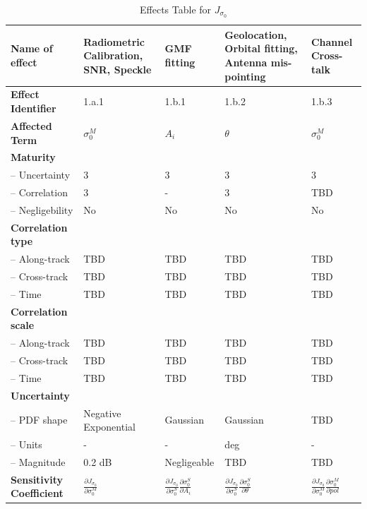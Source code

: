 \begin{table}[h]
	\centering
	\scriptsize %
	\setlength{\tabcolsep}{2pt} %
	\caption{Effects Table for $J_{\sigma_{0}}$}
	
	\begin{tabularx}{\textwidth}{l | X | X | X | X}
		\toprule
		\textbf{Name of effect} & Radiometric Calibration, SNR, Speckle & GMF fitting & Geolocation, Orbital fitting, Antenna mis-pointing & Channel Cross-talk \\
		\midrule
		\textbf{Effect Identifier} & 1.a.1 & 1.b.1 & 1.b.2 & 1.b.3 \\
		\midrule
		\textbf{Affected Term} & $\sigma_{0}^{M}$ & $A_{i}$ & $\theta$ & $\sigma_{0}^{M}$ \\
		\midrule
		\textbf{Maturity} &  &  & & \\
		\quad -- Uncertainty & 3 & 3 & 3 & 3 \\
		\quad -- Correlation & 3 & - & 3 & TBD \\
		\quad -- Negligebility & No & No & No & No \\
		\midrule
		\textbf{Correlation type} &  &  & & \\
		\quad -- Along-track & TBD & TBD & TBD & TBD \\
		\quad -- Cross-track & TBD & TBD & TBD & TBD \\
		\quad -- Time & TBD & TBD & TBD & TBD \\
		\midrule
		\textbf{Correlation scale} &  &  & & \\
		\quad -- Along-track & TBD & TBD & TBD & TBD \\
		\quad -- Cross-track & TBD & TBD & TBD & TBD \\
		\quad -- Time & TBD & TBD & TBD & TBD \\
		\midrule
		\textbf{Uncertainty} & & & & \\
		\quad -- PDF shape & Negative Exponential & Gaussian & Gaussian & TBD \\
		\quad -- Units & - & - & deg & - \\
		\quad -- Magnitude & 0.2 dB & Negligeable & TBD & TBD \\
		\midrule
		\textbf{Sensitivity Coefficient} & $\frac{\partial J_{\sigma_{0}}}{\partial \sigma_{0}^{M}}$ & $\frac{\partial J_{\sigma_{0}}}{\partial \sigma_{0}^{S}} \frac{\partial \sigma_{0}^{S}}{\partial A_{i}}$ & $\frac{\partial J_{\sigma_{0}}}{\partial \sigma_{0}^{S}} \frac{\partial \sigma_{0}^{S}}{\partial \theta}$ & $\frac{\partial J_{\sigma_{0}}}{\partial \sigma_{0}^{M}} \frac{\partial \sigma_{0}^{M}}{\partial pol}$ \\
		\bottomrule
	\end{tabularx}
	\label{tab: effects Js0}
\end{table}

